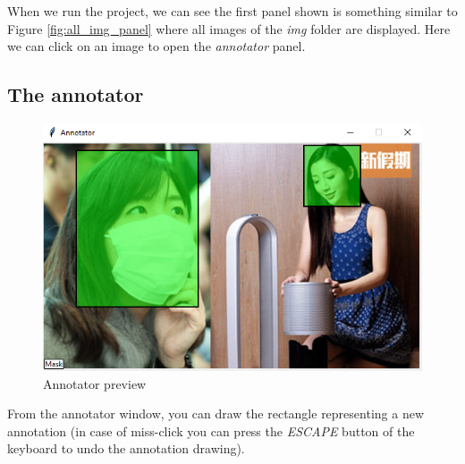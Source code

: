 \documentclass[a4paper,12pt]{article}
\begin{document}
When we run the project, we can see the first panel shown is something similar to Figure \ref{fig:all_img_panel} where all images of the \textit{img} folder are displayed.
Here we can click on an image to open the \textit{annotator} panel.
\subsection{The annotator}
\begin{figure}
    \centering
    \includegraphics[width=1.0\textwidth]{images_latex/Annotator.png}
    \caption{Annotator preview}
    \label{fig:annotator_preview}
\end{figure}

From the annotator window, you can draw the rectangle representing a new annotation (in case of miss-click you can press the \textit{ESCAPE} button of the keyboard to undo the annotation drawing).
\end{document}
